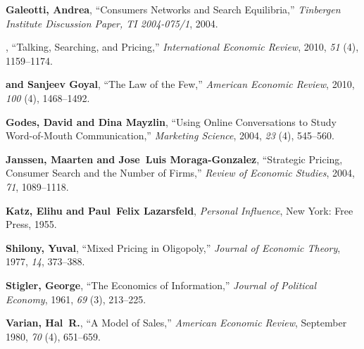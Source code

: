\documentclass[12pt]{article}
\begin{document}
\begin{thebibliography}{xx}
	{\bf Galeotti, Andrea}, ``Consumers Networks and Search 
	Equilibria,'' {\it
		Tinbergen Institute Discussion Paper, TI 2004-075/1}, 
		2004.
	
	{\bf \bysame{}}, ``Talking, Searching, and Pricing,'' {\it 
	International
		Economic Review}, 2010, {\it 51} (4), 1159--1174.
	
	{\bf \bysame{} and Sanjeev Goyal}, ``The Law of the Few,'' 
	{\it American
		Economic Review}, 2010, {\it 100} (4), 1468--1492.
	
	{\bf Godes, David and Dina Mayzlin}, ``Using Online 
	Conversations to Study
	Word-of-Mouth Communication,'' {\it Marketing Science}, 
	2004, {\it 23} (4),
	545--560.
	
	{\bf Janssen, Maarten and Jose~Luis Moraga-Gonzalez}, 
	``Strategic Pricing,
	Consumer Search and the Number of Firms,'' {\it Review of 
	Economic Studies},
	2004, {\it 71}, 1089--1118.
	
	{\bf Katz, Elihu and Paul~Felix Lazarsfeld}, {\it Personal 
	Influence}, New
	York: Free Press, 1955.
	
	{\bf Shilony, Yuval}, ``Mixed Pricing in Oligopoly,'' {\it 
	Journal of Economic
		Theory}, 1977, {\it 14}, 373--388.
	
	{\bf Stigler, George}, ``The Economics of Information,'' 
	{\it Journal of
		Political Economy}, 1961, {\it 69} (3), 213--225.
	
	{\bf Varian, Hal~R.}, ``A Model of Sales,'' {\it American 
	Economic Review},
	September 1980, {\it 70} (4), 651--659.
	
\end{thebibliography}
\end{document}
